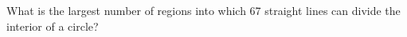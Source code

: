 What is the largest number of regions into which 67 straight lines can divide the interior of a circle?
